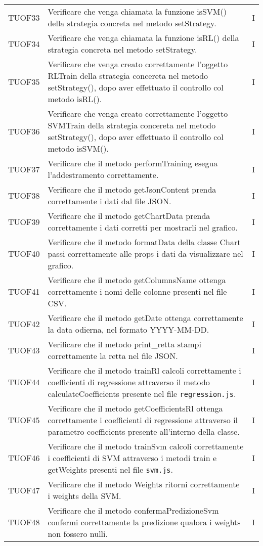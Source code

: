 \begin{longtable}{C{2cm} L{8cm} C{2cm}}
TUOF33 & Verificare che venga chiamata la funzione isSVM() della strategia concreta nel metodo setStrategy. & I \\
TUOF34 & Verificare che venga chiamata la funzione isRL() della strategia concreta nel metodo setStrategy. & I \\
TUOF35 & Verificare che venga creato correttamente l'oggetto RLTrain della strategia concereta nel metodo setStrategy(), dopo aver effettuato il controllo col metodo isRL(). & I \\
TUOF36 & Verificare che venga creato correttamente l'oggetto SVMTrain della strategia concereta nel metodo setStrategy(), dopo aver effettuato il controllo col metodo isSVM(). & I \\
TUOF37 & Verificare che il metodo performTraining esegua l'addestramento correttamente. & I \\
TUOF38 & Verificare che il metodo getJsonContent prenda correttamente i dati dal file JSON. & I \\
TUOF39 & Verificare che il metodo getChartData prenda correttamente i dati corretti per mostrarli nel grafico. & I \\
TUOF40 & Verificare che il metodo formatData della classe Chart passi correttamente alle props i dati da visualizzare nel grafico. & I \\
TUOF41 & Verificare che il metodo getColumnsName ottenga correttamente i nomi delle colonne presenti nel file CSV. & I \\
TUOF42 & Verificare che il metodo getDate ottenga correttamente la data odierna, nel formato YYYY-MM-DD. & I \\
TUOF43 & Verificare che il metodo print\_retta stampi correttamente la retta nel file JSON. & I \\
TUOF44 & Verificare che il metodo trainRl calcoli correttamente i coefficienti di regressione attraverso il metodo calculateCoefficients presente nel file \texttt{regression.js}. & I \\
TUOF45 & Verificare che il metodo getCoefficientsRl ottenga correttamente i coefficienti di regressione attraverso il parametro coefficients presente all'interno della classe. & I \\
TUOF46 & Verificare che il metodo trainSvm calcoli correttamente i coefficienti di SVM attraverso i metodi train e getWeights presenti nel file \texttt{svm.js}. & I \\
TUOF47 & Verificare che il metodo Weights ritorni correttamente i weights della SVM. & I \\
TUOF48 & Verificare che il metodo confermaPredizioneSvm confermi correttamente la predizione qualora i weights non fossero nulli. & I \\



\end{longtable}


